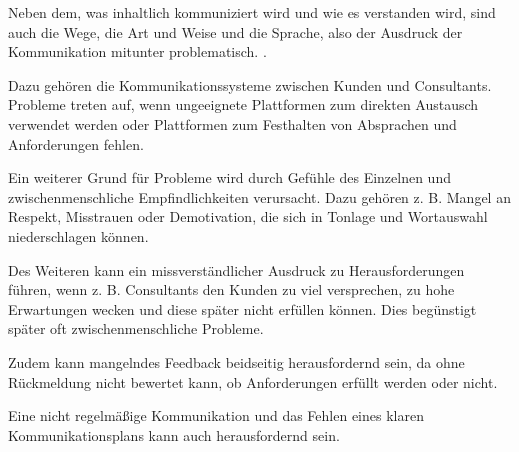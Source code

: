 \documentclass[../main.tex]{subfiles}
\begin{document}
Neben dem, was inhaltlich kommuniziert wird und wie es verstanden wird, sind auch die Wege, die Art und Weise und die Sprache, also der Ausdruck der Kommunikation mitunter problematisch. \autocite{cornelissen2023corporate}.

Dazu gehören die Kommunikationssysteme zwischen Kunden und Consultants. Probleme treten auf, wenn ungeeignete Plattformen zum direkten Austausch verwendet werden oder Plattformen zum Festhalten von Absprachen und Anforderungen fehlen.
\autocite{gamil2017identification,bjarnason2017role}

Ein weiterer Grund für Probleme wird durch Gefühle des Einzelnen und zwischenmenschliche Empfindlichkeiten verursacht.
Dazu gehören z. B. Mangel an Respekt, Misstrauen oder Demotivation, die sich in Tonlage und Wortauswahl niederschlagen können.
\autocite{mackenzie19597,appelbaum2005critical,bjarnason2017role}

Des Weiteren kann ein missverständlicher Ausdruck zu Herausforderungen führen, wenn z. B. Consultants den Kunden zu viel versprechen, zu hohe Erwartungen wecken und diese später nicht erfüllen können.
Dies begünstigt später oft zwischenmenschliche Probleme.
\autocite{mackenzie19597,appelbaum2005critical}

Zudem kann mangelndes Feedback beidseitig herausfordernd sein, da ohne Rückmeldung nicht bewertet kann, ob Anforderungen erfüllt werden oder nicht.
\autocite{bano2014aligning,reihlen2010knowledge}

Eine nicht regelmäßige Kommunikation und das Fehlen eines klaren Kommunikationsplans kann auch herausfordernd sein.
\autocite{gamil2017identification,bjarnason2017role}
\end{document}
